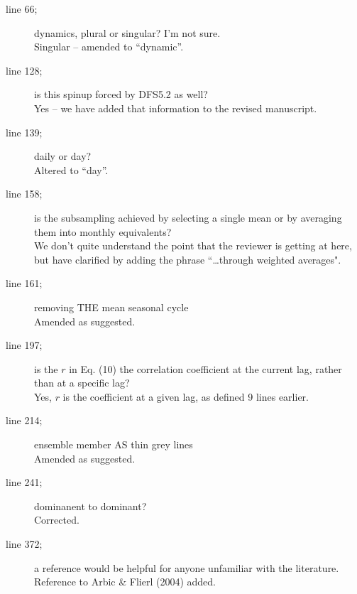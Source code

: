 \documentclass[11pt]{article}
\begin{document}
{\color{blue} 
\begin{description}
\item[line 66;] dynamics, plural or singular? I'm not sure.\\
{\color{black} Singular -- amended to ``dynamic''. }

\item[line 128;] is this spinup forced by DFS5.2 as well?\\
{\color{black} Yes -- we have added that information to the revised manuscript. }

\item[line 139;] daily or day?\\
{\color{black} Altered to ``day''.}

\item[line 158;] is the subsampling achieved by selecting a single mean or by averaging them into monthly equivalents?\\
{\color{black} We don't quite understand the point that the reviewer is getting at here, but have clarified by adding the phrase ``\ldots  through weighted averages". }

\item[line 161;] removing THE mean seasonal cycle\\
{\color{black} Amended as suggested.}

\item[line 197;] is the $r$ in Eq. (10) the correlation coefficient at the current lag, rather than at a specific lag?\\
{\color{black} Yes, $r$ is the coefficient at a given lag, as defined 9 lines earlier. }

\item[line 214;] ensemble member AS thin grey lines\\
{\color{black} Amended as suggested. }

\item[line 241;] dominanent to dominant?\\
{\color{black} Corrected. }

\item[line 372;] a reference would be helpful for anyone unfamiliar with the literature.\\
{\color{black} Reference to Arbic \& Flierl (2004) added. }

\end{description}
}
\end{document}
